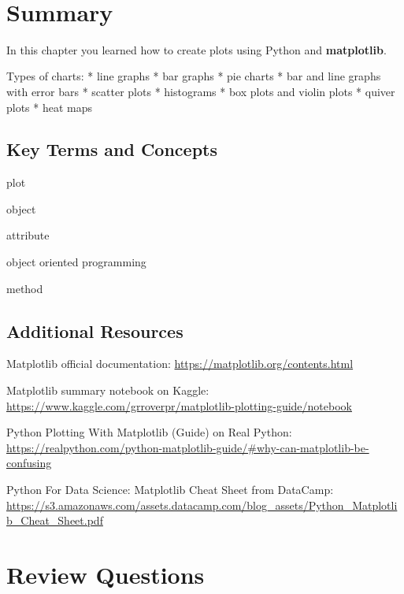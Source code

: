 \documentclass{book}
\begin{document}
    \begin{center}
    \end{center}
    { \hspace*{\fill} \\}
    
    \section{Summary}\label{summary}

    In this chapter you learned how to create plots using Python and
\textbf{matplotlib}.

    Types of charts: * line graphs * bar graphs * pie charts * bar and line
graphs with error bars * scatter plots * histograms * box plots and
violin plots * quiver plots * heat maps

    \subsection{Key Terms and Concepts}\label{key-terms-and-concepts}

plot

object

attribute

object oriented programming

method

    \subsection{Additional Resources}\label{additional-resources}

    Matplotlib official documentation:
\url{https://matplotlib.org/contents.html}

Matplotlib summary notebook on Kaggle:
\url{https://www.kaggle.com/grroverpr/matplotlib-plotting-guide/notebook}

Python Plotting With Matplotlib (Guide) on Real Python:
\url{https://realpython.com/python-matplotlib-guide/\#why-can-matplotlib-be-confusing}

Python For Data Science: Matplotlib Cheat Sheet from DataCamp:
\url{https://s3.amazonaws.com/assets.datacamp.com/blog_assets/Python_Matplotlib_Cheat_Sheet.pdf}

    \section{Review Questions}\label{review-questions}
\end{document}
